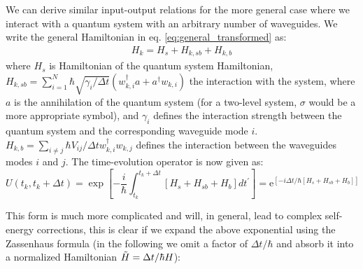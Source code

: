 We can derive similar input-output relations for the more general case where we interact with a quantum system with an arbitrary number of waveguides. We write the general Hamiltonian in eq. \eqref{eq:general_transformed} as: 
\begin{equation}
\begin{aligned}
H_k = H_{s} + H_{k,sb} + H_{k,b} \label{eq:generalinteraction}
\end{aligned}
\end{equation}
where $H_{s}$ is Hamiltonian of the quantum system Hamiltonian, $H_{k,sb} = \sum_{i=1}^N \hbar \sqrt{\gamma_i/\Delta t} \left(w_{k,i}^{\dagger} a+a^{\dagger} w_{k,i} \right)$ the interaction with the system, where $a$ is the annihilation of the quantum system (for a two-level system, $\sigma$ would be a more appropriate symbol), and $\gamma_i$ defines the interaction strength between the quantum system and the corresponding waveguide mode $i$. $ H_{k,b} = \sum_{i \neq j} \hbar  V_{i j}/\Delta t w_{k,i}^{\dagger} w_{k,j}$ defines the interaction between the waveguides modes $i$ and $j$. The time-evolution operator is now given as:
\begin{equation}
    U(t_k,t_k+\Delta t) =\exp \left[-\frac{i}{\hbar} \int_{t_k}^{t_k+\Delta t} [ H_s + H_{sb} + H_b ] d t^{\prime}\right] = \mathrm{e}^{ \left[ -i \Delta t / \hbar [ H_s + H_{sb} + H_b ] \right ]}
\end{equation}

This form is much more complicated and will, in general, lead to complex self-energy corrections, this is clear if we expand the above exponential using the Zassenhaus formula (in the following we omit a factor of $\Delta t/\hbar$ and absorb it into a normalized Hamiltonian $\Tilde{H} = \Delta t/\hbar H$):

